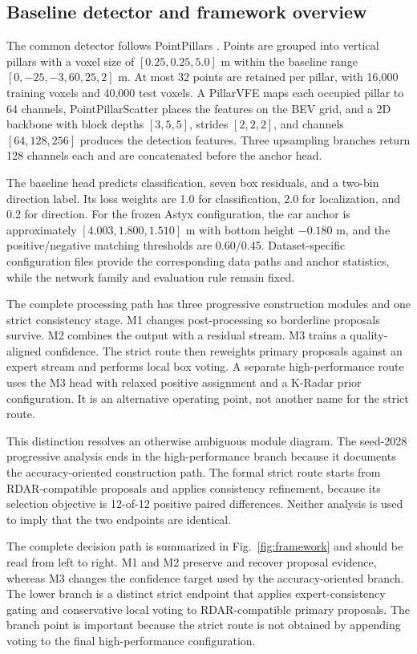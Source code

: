\documentclass[final,5p,times]{elsarticle}
\newcommand{\figref}[1]{\textcolor{floatreviewblue}{Fig.~\ref{#1}}}
\newcommand{\figref}[1]{Fig.~\ref{#1}}
\begin{document}
\subsection{Baseline detector and framework overview}

The common detector follows PointPillars
\cite{lang2019pointpillars}. Points are grouped into vertical pillars with a
voxel size of $[0.25,0.25,5.0]$ m within the baseline range
$[0,-25,-3,60,25,2]$ m. At most 32 points are retained per pillar, with
16,000 training voxels and 40,000 test voxels. A PillarVFE maps each occupied
pillar to 64 channels, PointPillarScatter places the features on the BEV grid,
and a 2D backbone with block depths $[3,5,5]$, strides $[2,2,2]$, and channels
$[64,128,256]$ produces the detection features. Three upsampling branches
return 128 channels each and are concatenated before the anchor head.

The baseline head predicts classification, seven box residuals, and a
two-bin direction label. Its loss weights are 1.0 for classification, 2.0 for
localization, and 0.2 for direction. For the frozen Astyx configuration, the
car anchor is approximately $[4.003,1.800,1.510]$ m with bottom height
$-0.180$ m, and the positive/negative matching thresholds are 0.60/0.45.
Dataset-specific configuration files provide the corresponding data paths and
anchor statistics, while the network family and evaluation rule remain fixed.

The complete processing path has three progressive construction modules and
one strict consistency stage. M1 changes post-processing so borderline
proposals survive. M2 combines the output with a residual stream. M3 trains a
quality-aligned confidence. The strict route then reweights primary proposals
against an expert stream and performs local box voting. A separate
high-performance route uses the M3 head with relaxed positive assignment and a
K-Radar prior configuration. It is an alternative operating point, not another
name for the strict route.

This distinction resolves an otherwise ambiguous module diagram. The
seed-2028 progressive analysis ends in the high-performance branch because it
documents the accuracy-oriented construction path. The formal strict
route starts from RDAR-compatible proposals and applies consistency refinement,
because its selection objective is 12-of-12 positive paired differences.
Neither analysis is used to imply that the two endpoints are identical.

The complete decision path is summarized in \figref{fig:framework} and should
be read from left to right. M1 and M2 preserve and recover proposal evidence,
whereas M3 changes the confidence target used by the accuracy-oriented branch.
The lower branch is a distinct strict endpoint that applies expert-consistency
gating and conservative local voting to RDAR-compatible primary proposals.
The branch point is important because the strict route is not obtained by
appending voting to the final high-performance configuration.
\end{document}
